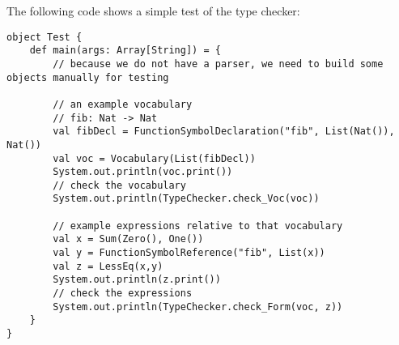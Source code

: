 The following code shows a simple test of the type checker:
\begin{lstlisting}
object Test {
    def main(args: Array[String]) = {
        // because we do not have a parser, we need to build some objects manually for testing
        
        // an example vocabulary
        // fib: Nat -> Nat
        val fibDecl = FunctionSymbolDeclaration("fib", List(Nat()), Nat())
        val voc = Vocabulary(List(fibDecl))
        System.out.println(voc.print()) 
        // check the vocabulary
        System.out.println(TypeChecker.check_Voc(voc))  

        // example expressions relative to that vocabulary
        val x = Sum(Zero(), One())
        val y = FunctionSymbolReference("fib", List(x))
        val z = LessEq(x,y)
        System.out.println(z.print())
        // check the expressions      
        System.out.println(TypeChecker.check_Form(voc, z))
    }
}
\end{lstlisting}